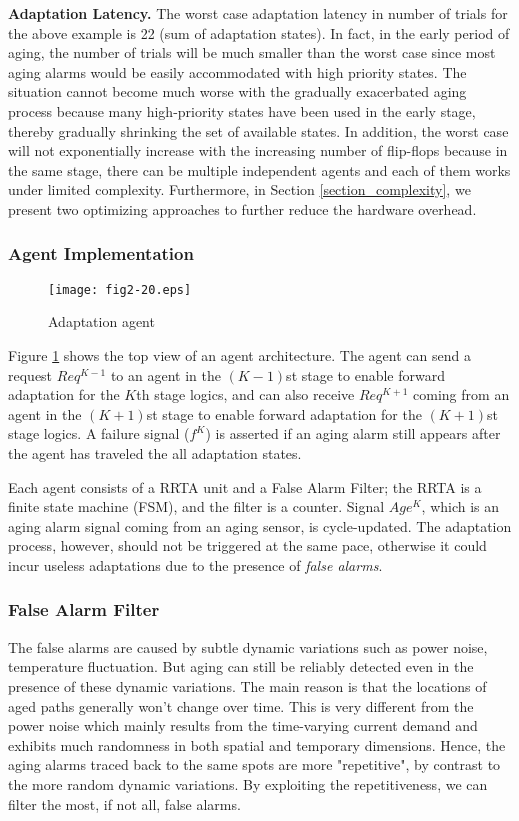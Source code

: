 {\bf Adaptation Latency.} The worst case adaptation latency  in number of trials for the above example is 22 (sum of adaptation states). In fact, in the early period of aging, the number of trials will be much smaller than the worst case since most aging alarms would be easily accommodated with high priority states. The situation cannot become much worse with the gradually exacerbated aging process because many high-priority states have been used in the early stage, thereby gradually shrinking the set of available states. In addition, the worst case will not exponentially increase with the increasing number of flip-flops because in the same stage, there can be multiple independent agents and each of them works under limited complexity. Furthermore, in Section \ref{section_complexity}, we present two optimizing approaches to further reduce the hardware overhead.


\subsubsection {Agent Implementation}
\begin{figure}[t]
\centering
\texttt{[image: fig2-20.eps]}%
   \caption{Adaptation agent}\label{agent}
\end{figure}

Figure \ref{agent} shows the top view of an agent architecture. The agent can send a request $Req^{K-1}$ to an agent in the $(K-1)$st stage to enable forward adaptation for the $K$th stage logics, and can also receive $Req^{K+1}$ coming from an agent in the $(K+1)$st stage to enable forward adaptation for the $(K+1)$st stage logics. A failure signal ($f^K$) is asserted if an aging alarm still appears after the agent has traveled the all adaptation states.

Each agent consists of a RRTA unit and a False Alarm Filter; the RRTA is a finite state machine (FSM), and the filter is a counter. Signal $Age^K$, which is an aging alarm signal coming from an aging sensor, is cycle-updated. The adaptation process, however, should not be triggered at the same pace, otherwise it could incur useless adaptations due to the presence of \emph{false alarms}.

\subsubsection{False Alarm Filter}
The false alarms are caused by subtle dynamic variations \cite{degradation_05} such as power noise, temperature fluctuation. But aging can still be reliably detected even in the presence of these dynamic variations. The main reason is that the locations of aged paths generally won't change over time. This is very different from the power noise which mainly results from the time-varying current demand and exhibits much randomness in both spatial and temporary dimensions. Hence, the aging alarms traced back to the same spots are more "repetitive", by contrast to the more random dynamic variations. By exploiting the repetitiveness, we can filter the most, if not all, false alarms.


